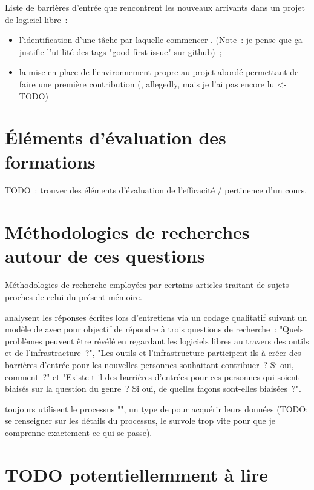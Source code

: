 Liste de barrières d'entrée que rencontrent les nouveaux arrivants dans un projet de logiciel libre :

\begin{itemize}
    \item l'identification d'une tâche par laquelle commencer . (Note : je
        pense que ça justifie l'utilité des tags "good first issue" sur \gls{github}) ;
    \item la mise en place de l'environnement propre au projet abordé permettant de faire une première
        contribution (, allegedly, mais je l'ai pas encore lu <- TODO)
\end{itemize}

\section{Éléments d'évaluation des formations}

TODO : trouver des éléments d'évaluation de l'efficacité / pertinence d'un cours.

\section{Méthodologies de recherches autour de ces questions}

Méthodologies de recherche employées par certains articles traitant de sujets proches de celui du présent
mémoire.

\textcite[p.~1006]{barriers-2018} analysent les réponses écrites lors d'entretiens via un codage
qualitatif suivant un modèle de  avec pour objectif de répondre à trois questions
de recherche : "Quels problèmes peuvent être révélé en regardant les logiciels libres au travers des outils et
de l'infrastracture ?", "Les outils et l'infrastructure participent-ils à créer des barrières d'entrée pour
les nouvelles personnes souhaitant contribuer ? Si oui, comment ?" et "Existe-t-il des barrières d'entrées
pour ces personnes qui soient biaisés sur la question du genre ? Si oui, de quelles façons sont-elles
biaisées ?".

\textcite[p.~1006]{barriers-2018} toujours utilisent le processus "", un type de  pour acquérir leurs données (TODO: se renseigner sur les détails du processus,
\textcite{barriers-2018} le survole trop vite pour que je comprenne exactement ce qui se passe).

\section{TODO potentiellemment à lire}

